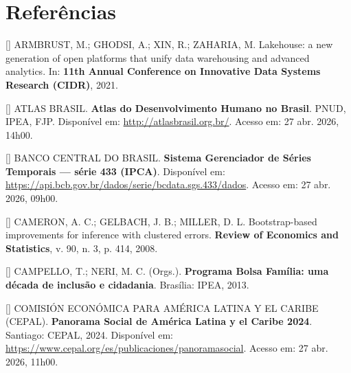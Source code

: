 \documentclass[12pt,a4paper,oneside]{article}
\begin{document}
\section*{Referências}\label{sec:ref}
\begin{singlespace}\small
\noindent\hangindent=1.25cm
[\theequation\label{ref:armbrust}]
ARMBRUST, M.; GHODSI, A.; XIN, R.; ZAHARIA, M. Lakehouse: a new
generation of open platforms that unify data warehousing and advanced
analytics. In: \textbf{11th Annual Conference on Innovative Data
Systems Research (CIDR)}, 2021.\par\smallskip

\noindent\hangindent=1.25cm
[\theequation\label{ref:atlas-brasil}]
ATLAS BRASIL. \textbf{Atlas do Desenvolvimento Humano no Brasil}.
PNUD, IPEA, FJP. Disponível em: \url{http://atlasbrasil.org.br/}.
Acesso em: 27 abr. 2026, 14h00.\par\smallskip

\noindent\hangindent=1.25cm
[\theequation\label{ref:bcb-sgs}]
BANCO CENTRAL DO BRASIL. \textbf{Sistema Gerenciador de Séries
Temporais — série 433 (IPCA)}. Disponível em:
\url{https://api.bcb.gov.br/dados/serie/bcdata.sgs.433/dados}.
Acesso em: 27 abr. 2026, 09h00.\par\smallskip

\noindent\hangindent=1.25cm
[\theequation\label{ref:cameron}]
CAMERON, A. C.; GELBACH, J. B.; MILLER, D. L. Bootstrap-based
improvements for inference with clustered errors. \textbf{Review of
Economics and Statistics}, v. 90, n. 3, p. 414,
2008.\par\smallskip

\noindent\hangindent=1.25cm
[\theequation\label{ref:campello}]
CAMPELLO, T.; NERI, M. C. (Orgs.). \textbf{Programa Bolsa Família:
uma década de inclusão e cidadania}. Brasília: IPEA, 2013.\par\smallskip

\noindent\hangindent=1.25cm
[\theequation\label{ref:cepal}]
COMISIÓN ECONÓMICA PARA AMÉRICA LATINA Y EL CARIBE (CEPAL).
\textbf{Panorama Social de América Latina y el Caribe 2024}.
Santiago: CEPAL, 2024. Disponível em:
\url{https://www.cepal.org/es/publicaciones/panoramasocial}.
Acesso em: 27 abr. 2026, 11h00.\par\smallskip


\end{singlespace}
\end{document}
